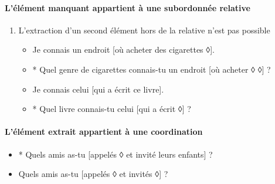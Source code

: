 \documentclass[UTF8]{report}
\begin{document}
\paragraph{L’élément manquant appartient à une subordonnée relative}
\begin{enumerate}
    \item L’extraction d’un second élément hors de la relative n’est pas possible
    \begin{itemize}
        \item Je connais un endroit [où acheter des cigarettes ◊].
        \item * Quel genre de cigarettes connais-tu un endroit [où acheter ◊ ◊] ?
        \item Je connais celui [qui a écrit ce livre].
        \item * Quel livre connais-tu celui [qui a écrit ◊] ?
    \end{itemize}
\end{enumerate}
\paragraph{L’élément extrait appartient à une coordination}
\begin{itemize}
    \item * Quels amis as-tu [appelés ◊ et invité leurs enfants] ?
    \item Quels amis as-tu [appelés ◊ et invités ◊] ?
\end{itemize}
\end{document}
